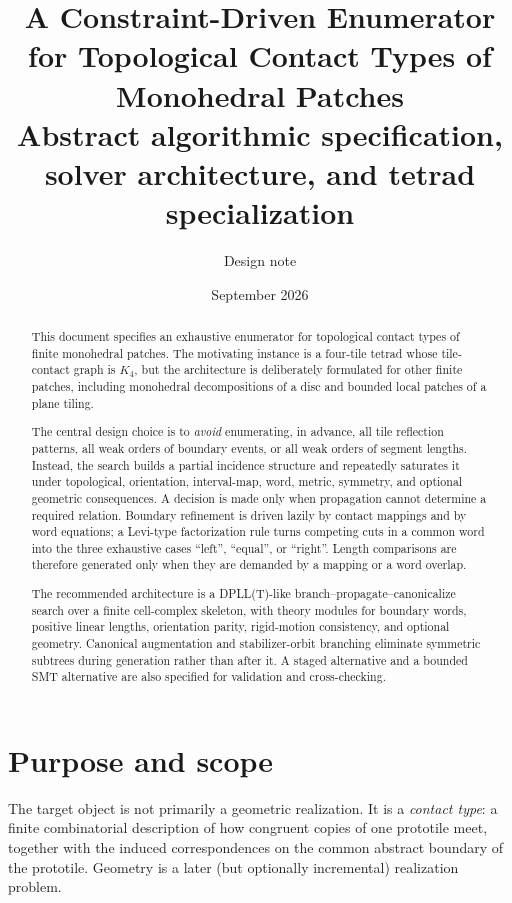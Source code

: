 \documentclass[11pt]{article}
\title{\textbf{A Constraint-Driven Enumerator for Topological Contact Types of Monohedral Patches}\\
\large Abstract algorithmic specification, solver architecture, and tetrad specialization}
\author{Design note}
\date{September 2026}
\begin{document}
\maketitle

\begin{abstract}
This document specifies an exhaustive enumerator for topological contact types of finite monohedral patches.  The motivating instance is a four-tile tetrad whose tile-contact graph is $K_4$, but the architecture is deliberately formulated for other finite patches, including monohedral decompositions of a disc and bounded local patches of a plane tiling.

The central design choice is to \emph{avoid} enumerating, in advance, all tile reflection patterns, all weak orders of boundary events, or all weak orders of segment lengths.  Instead, the search builds a partial incidence structure and repeatedly saturates it under topological, orientation, interval-map, word, metric, symmetry, and optional geometric consequences.  A decision is made only when propagation cannot determine a required relation.  Boundary refinement is driven lazily by contact mappings and by word equations; a Levi-type factorization rule turns competing cuts in a common word into the three exhaustive cases ``left'', ``equal'', or ``right''.  Length comparisons are therefore generated only when they are demanded by a mapping or a word overlap.

The recommended architecture is a DPLL(T)-like branch--propagate--canonicalize search over a finite cell-complex skeleton, with theory modules for boundary words, positive linear lengths, orientation parity, rigid-motion consistency, and optional geometry.  Canonical augmentation and stabilizer-orbit branching eliminate symmetric subtrees during generation rather than after it.  A staged alternative and a bounded SMT alternative are also specified for validation and cross-checking.
\end{abstract}

\tableofcontents
\newpage

\section{Purpose and scope}

The target object is not primarily a geometric realization.  It is a \emph{contact type}: a finite combinatorial description of how congruent copies of one prototile meet, together with the induced correspondences on the common abstract boundary of the prototile.  Geometry is a later (but optionally incremental) realization problem.
\end{document}
